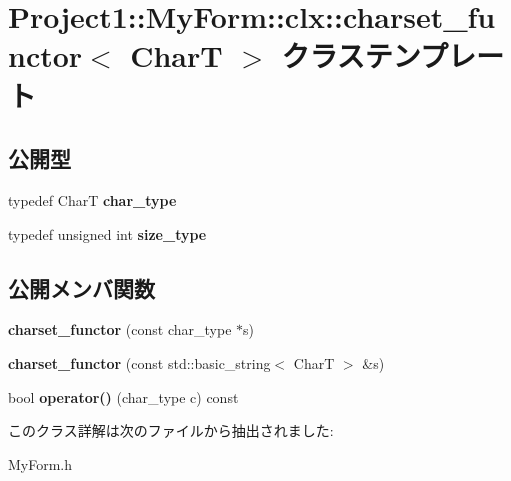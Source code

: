 \hypertarget{class_project1_1_1_my_form_1_1clx_1_1charset__functor}{}\section{Project1\+:\+:My\+Form\+:\+:clx\+:\+:charset\+\_\+functor$<$ CharT $>$ クラステンプレート}
\label{class_project1_1_1_my_form_1_1clx_1_1charset__functor}
\subsection*{公開型}
\begin{DoxyCompactItemize}
\item 
\mbox{\label{class_project1_1_1_my_form_1_1clx_1_1charset__functor_af46a677fedd21f2dd81e8e2f6d92871e}} 
typedef CharT {\bfseries char\+\_\+type}
\item 
\mbox{\label{class_project1_1_1_my_form_1_1clx_1_1charset__functor_a085c2a025adffe0c9585999580e36d4b}} 
typedef unsigned int {\bfseries size\+\_\+type}
\end{DoxyCompactItemize}
\subsection*{公開メンバ関数}
\begin{DoxyCompactItemize}
\item 
\mbox{\label{class_project1_1_1_my_form_1_1clx_1_1charset__functor_a3520f73cbbd9d52daa0d574804a346a9}} 
{\bfseries charset\+\_\+functor} (const char\+\_\+type $\ast$s)
\item 
\mbox{\label{class_project1_1_1_my_form_1_1clx_1_1charset__functor_a4e3d94cad00f37f1240e4b892503f5ad}} 
{\bfseries charset\+\_\+functor} (const std\+::basic\+\_\+string$<$ CharT $>$ \&s)
\item 
\mbox{\label{class_project1_1_1_my_form_1_1clx_1_1charset__functor_afa975ba6f5be1d62a25349ab63324dcb}} 
bool {\bfseries operator()} (char\+\_\+type c) const
\end{DoxyCompactItemize}


このクラス詳解は次のファイルから抽出されました\+:\begin{DoxyCompactItemize}
\item 
My\+Form.\+h\end{DoxyCompactItemize}
